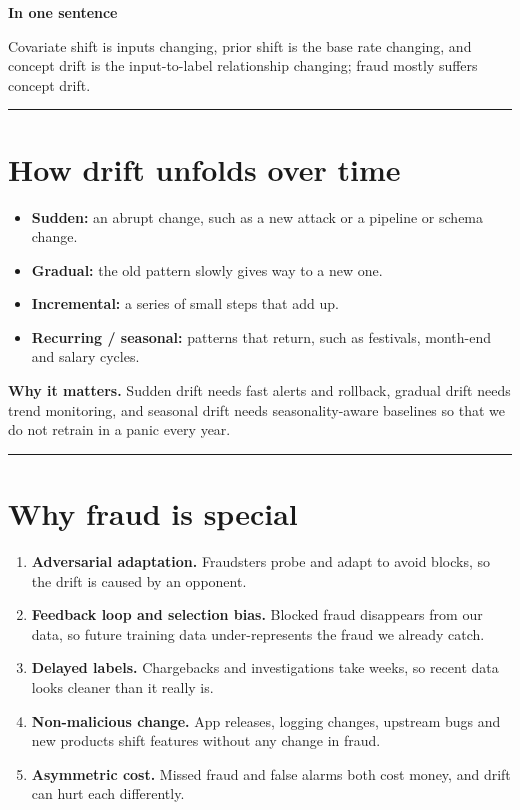 \documentclass[11pt]{article}
\begin{document}
\textbf{In one sentence}

Covariate shift is inputs changing, prior shift is the base rate changing, and concept drift is the input-to-label relationship changing; fraud mostly suffers concept drift.

\vspace{5mm}
\hrule
\vspace{5mm}

\section{How drift unfolds over time}

\begin{itemize}
    \item \textbf{Sudden:} an abrupt change, such as a new attack or a pipeline or schema change.
    \item \textbf{Gradual:} the old pattern slowly gives way to a new one.
    \item \textbf{Incremental:} a series of small steps that add up.
    \item \textbf{Recurring / seasonal:} patterns that return, such as festivals, month-end and salary cycles.
\end{itemize}

\textbf{Why it matters.} Sudden drift needs fast alerts and rollback, gradual drift needs trend monitoring, and seasonal drift needs seasonality-aware baselines so that we do not retrain in a panic every year.

\vspace{5mm}
\hrule
\vspace{5mm}

\section{Why fraud is special}

\begin{enumerate}
    \item \textbf{Adversarial adaptation.} Fraudsters probe and adapt to avoid blocks, so the drift is caused by an opponent.
    \item \textbf{Feedback loop and selection bias.} Blocked fraud disappears from our data, so future training data under-represents the fraud we already catch.
    \item \textbf{Delayed labels.} Chargebacks and investigations take weeks, so recent data looks cleaner than it really is.
    \item \textbf{Non-malicious change.} App releases, logging changes, upstream bugs and new products shift features without any change in fraud.
    \item \textbf{Asymmetric cost.} Missed fraud and false alarms both cost money, and drift can hurt each differently.
\end{enumerate}
\end{document}

